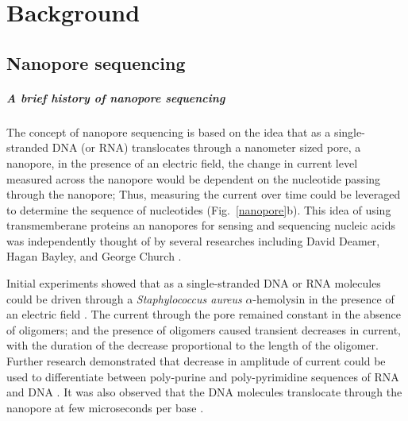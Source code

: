 \chapter{Background}
\label{ch2}

\section{Nanopore sequencing}

\paragraph{A brief history of nanopore sequencing}
The concept of nanopore sequencing is based on the idea that as a
single-stranded DNA (or RNA) translocates through a nanometer sized
pore, a nanopore, in the presence of an electric field, the change in
current level measured across the nanopore would be dependent on the
nucleotide passing through the nanopore; Thus, measuring the current
over time could be leveraged to determine the sequence of nucleotides
(Fig.~\ref{nanopore}b).
%
This idea of using transmemberane proteins an nanopores for sensing and
sequencing nucleic acids was independently thought of by several
researches including David Deamer, Hagan Bayley, and George Church
\citep{deamer2016three,bayley2015nanopore,branton2010potential}.

Initial experiments showed that as a single-stranded DNA or RNA
molecules could be driven through a \emph{Staphylococcus aureus}
$\alpha$-hemolysin in the presence of an electric field
\citep{kasianowicz1996characterization}. The current through the pore
remained constant in the absence of oligomers; and the presence of oligomers
caused transient decreases in current, with the duration of the decrease
proportional to the length of the oligomer.
Further research demonstrated that decrease in amplitude of current
could be used to differentiate between poly-purine and poly-pyrimidine
sequences of RNA \citep{akeson1999microsecond} and DNA
\citep{meller2000rapid}. It was also observed that the DNA molecules
translocate through the nanopore at few microseconds per base
\citep{meller2000rapid}.

